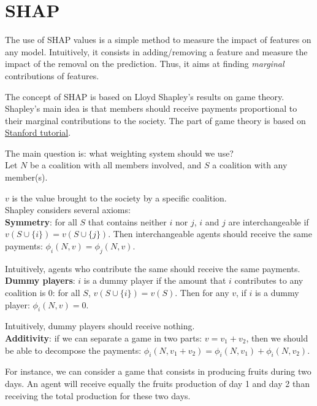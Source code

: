 \section*{SHAP}

The use of SHAP values is a simple method to measure the impact of features on any model. Intuitively, it consists in adding/removing a feature and measure the impact of the removal on the prediction. Thus, it aims at finding \textit{marginal} contributions of features. 

The concept of SHAP is based on Lloyd Shapley's results on game theory. Shapley's main idea is that members should receive payments proportional to their marginal contributions to the society. The part of game theory is based on \href{https://www.youtube.com/watch?v=qcLZMYPdpH4}{Stanford tutorial}.

The main question is: what weighting system should we use? \\

Let $N$ be a coalition with all members involved, and $S$ a coalition with any member(s).

$v$ is the value brought to the society by a specific coalition. \\

Shapley considers several axioms: \\

\textbf{Symmetry}: for all $S$ that contains neither $i$ nor $j$, $i$ and $j$ are interchangeable if $v(S \cup \{i\})=v(S \cup \{j\})$. Then interchangeable agents should receive the same payments: $\phi_i(N,v)=\phi_j(N,v)$.

Intuitively, agents who contribute the same should receive the same payments. \\

\textbf{Dummy players}: $i$ is a dummy player if the amount that $i$ contributes to any coalition is $0$: for all $S$, $v(S \cup \{i\})=v(S)$. Then for any $v$, if $i$ is a dummy player: $\phi_i(N,v)=0$.

Intuitively, dummy players should receive nothing. \\

\textbf{Additivity}: if we can separate a game in two parts: $v=v_1 + v_2$, then we should be able to decompose the payments: $\phi_i(N, v_1+v_2) = \phi_i(N, v_1) + \phi_i(N, v_2)$.

For instance, we can consider a game that consists in producing fruits during two days. An agent will receive equally the fruits production of day 1 and day 2 than receiving the total production for these two days. \\

